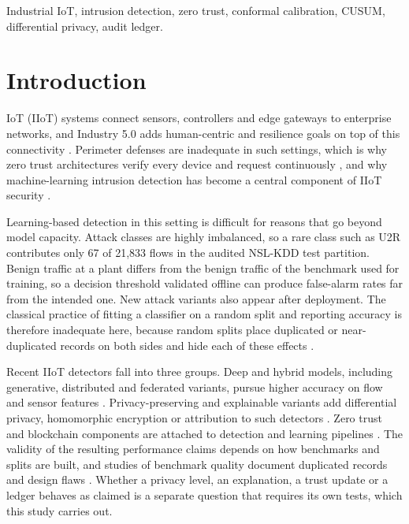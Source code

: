 \documentclass[journal]{IEEEtran}
\begin{document}
\begin{IEEEkeywords}
Industrial IoT, intrusion detection, zero trust, conformal calibration, CUSUM, differential privacy, audit ledger.
\end{IEEEkeywords}

\section{Introduction}
 IoT (IIoT) systems connect sensors, controllers and edge gateways to enterprise networks, and Industry 5.0 adds human-centric and resilience goals on top of this connectivity \cite{leng2022industry}. Perimeter defenses are inadequate in such settings, which is why zero trust architectures verify every device and request continuously \cite{rose2020zero}, and why machine-learning intrusion detection has become a central component of IIoT security \cite{aouedi2024survey,nandanwar2024deep}.

Learning-based detection in this setting is difficult for reasons that go beyond model capacity. Attack classes are highly imbalanced, so a rare class such as U2R contributes only 67 of 21,833 flows in the audited NSL-KDD test partition. Benign traffic at a plant differs from the benign traffic of the benchmark used for training, so a decision threshold validated offline can produce false-alarm rates far from the intended one. New attack variants also appear after deployment. The classical practice of fitting a classifier on a random split and reporting accuracy is therefore inadequate here, because random splits place duplicated or near-duplicated records on both sides and hide each of these effects \cite{arp2022dos,engelen2021troubleshooting}.

Recent IIoT detectors fall into three groups. Deep and hybrid models, including generative, distributed and federated variants, pursue higher accuracy on flow and sensor features \cite{nandanwar2024deep,hamouda2024revolutionizing,bhavsar2024fl,mohamed2025artificial}. Privacy-preserving and explainable variants add differential privacy, homomorphic encryption or attribution to such detectors \cite{chen2025privacy,saheed2025cps,manh2025privacy,islam2025explainable}. Zero trust and blockchain components are attached to detection and learning pipelines \cite{zanasi2024flexible,rehman2025immersive,hezam2026dp,mishra2026zero,tong2024blockchain}. The validity of the resulting performance claims depends on how benchmarks and splits are built, and studies of benchmark quality document duplicated records and design flaws \cite{engelen2021troubleshooting,flood2024bad}. Whether a privacy level, an explanation, a trust update or a ledger behaves as claimed is a separate question that requires its own tests, which this study carries out.
\end{document}
